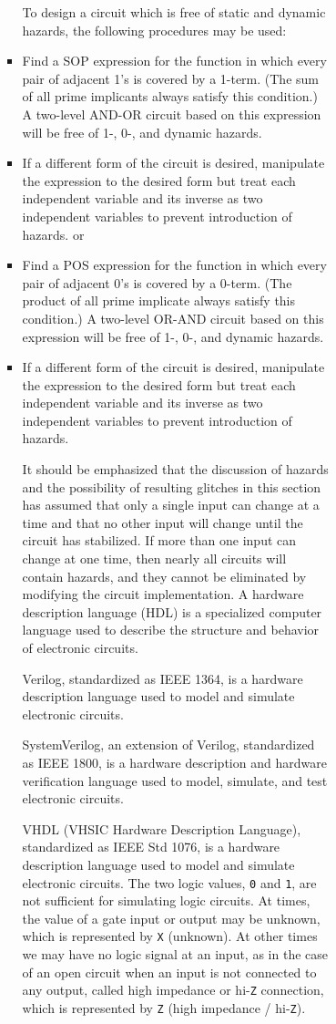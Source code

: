 \documentclass[a4paper,12pt]{article}
\begin{document}
\begin{itemize}
\begin{itemize}
\begin{itemize}
\begin{itemize}
\begin{itemize}
\begin{itemize}
\begin{itemize}
To design a circuit  which is free of static and dynamic hazards, the following procedures may be used:
\ben
\item Find a SOP expression for the function in which every pair of adjacent 1's is covered by a 1-term. (The sum of all prime implicants always satisfy this condition.) A two-level AND-OR circuit based on this expression will be free of 1-, 0-, and dynamic hazards.
\item If a different form of the circuit is desired, manipulate the expression to the desired form but treat each independent variable and its inverse as two independent variables to prevent introduction of hazards.
\een
or
\ben
\item Find a POS expression for the function in which every pair of adjacent 0's is covered by a 0-term. (The product of all prime implicate always satisfy this condition.) A two-level OR-AND circuit based on this expression will be free of 1-, 0-, and dynamic hazards.
\item If a different form of the circuit is desired, manipulate the expression to the desired form but treat each independent variable and its inverse as two independent variables to prevent introduction of hazards.
\een

It should be emphasized that the discussion of hazards and the possibility of resulting glitches in this section has assumed that only a single input can change at a time and that no other input will change until the circuit has stabilized. If more than one input can change at one time, then nearly all circuits will contain hazards, and they cannot be eliminated by modifying the circuit implementation.
A hardware description language (HDL) is a specialized computer language used to describe the structure and behavior of electronic circuits.

Verilog, standardized as IEEE 1364, is a hardware description language used to model and simulate electronic circuits.

SystemVerilog, an extension of Verilog, standardized as IEEE 1800, is a hardware description and hardware verification language used to model, simulate, and test electronic circuits.

VHDL (VHSIC Hardware Description Language), standardized as IEEE Std 1076, is a hardware description language used to model and simulate electronic circuits.
The two logic values, \texttt{0} and \texttt{1}, are not sufficient for simulating logic circuits. At times, the value of a gate input or output may be unknown, which is represented by \texttt{X} (unknown). At other times we may have no logic signal at an input, as in the case of an open circuit when an input is not connected to any output, called high impedance or hi-\texttt{Z} connection, which is represented by \texttt{Z} (high impedance / hi-\texttt{Z}).


\end{itemize}
\end{itemize}
\end{itemize}
\end{itemize}
\end{itemize}
\end{itemize}
\end{itemize}
\end{document}
